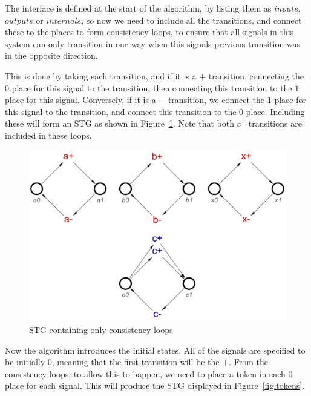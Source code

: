 \documentclass[british, journal]{IEEEtran}
\begin{document}
The interface is defined at the start of the algorithm, by listing them as $inputs$,
$outputs$ or $internals$, so now we need to include all the transitions, and
connect these to the places to form consistency loops, to ensure that all signals 
in this system can only transition in one way when this signals previous transition
was in the opposite direction. 

This is done by taking each transition, and if it is a $+$ transition, connecting 
the $0$ place for this signal to the transition, then connecting this transition to 
the $1$ place for this signal. Conversely, if it is a $-$ transition, we connect the
$1$ place for this signal to the transition, and connect this transition to the $0$ 
place. Including these will form an STG as shown in Figure~\ref{fig:loops}. Note
that both $c^{+}$ transitions are included in these loops.

\begin{figure}[h]
\begin{centering}
\includegraphics[scale=0.25]{Images/or-gate-ctrl-loops-stg}
\par\end{centering}
\vspace{-1mm}
\protect\caption{\label{fig:loops} STG containing only consistency loops}
\vspace{-3mm}
\end{figure}

Now the algorithm introduces the initial states. All of the signals are specified
to be initially 0, meaning that the first transition will be the $+$. From the
consistency loops, to allow this to happen, we need to place a token in each 
$0$ place for each signal. This will produce the STG displayed in Figure~\ref{fig:tokens}.
\end{document}
